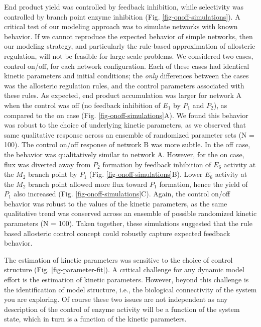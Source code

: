 \documentclass[12pt]{article}
\begin{document}
End product yield was controlled by feedback inhibition, while selectivity was controlled by branch point enzyme inhibition (Fig. \ref{fig-onoff-simulations}).
A critical test of our modeling approach was to simulate networks with known behavior. If we cannot reproduce the expected behavior of simple networks, then our
modeling strategy, and particularly the rule-based approximation of allosteric regulation, will not be feasible for large scale problems.
We considered two cases,  control on/off, for each network configuration. 
Each of these cases had identical kinetic parameters and initial conditions; 
the \textit{only} differences between the cases was the allosteric regulation rules, and the control parameters associated with these rules. 
As expected, end product accumulation was larger for network A when the control was off (no feedback inhibition of $E_{1}$ by $P_{1}$ and $P_{2}$),
as compared to the on case (Fig. \ref{fig-onoff-simulations}A). We found this behavior was robust to the choice of underlying kinetic parameters, 
as we observed that same qualitative response across an ensemble of randomized parameter sets (N = 100). 
The control on/off response of network B was more subtle. In the off case, the behavior was qualitatively similar to network A. 
However, for the on case, flux was diverted away from $P_{2}$ formation by feedback inhibition of $E_{6}$ activity at the $M_{2}$ branch point by $P_{1}$ (Fig. \ref{fig-onoff-simulations}B).
Lower $E_{6}$ activity at the $M_{2}$ branch point allowed more flux toward $P_{1}$ formation, hence the yield of $P_{1}$ also increased (Fig. \ref{fig-onoff-simulations}C).
Again, the control on/off behavior was robust to the values of the kinetic parameters, as the same qualitative trend was conserved across 
an ensemble of possible randomized kinetic parameters (N = 100). Taken together, these simulations suggested that the rule based allosteric control 
concept could robustly capture expected feedback behavior.

The estimation of kinetic parameters was sensitive to the choice of control structure (Fig. \ref{fig-parameter-fit}).
A critical challenge for any dynamic model effort is the estimation of kinetic parameters. 
However, beyond this challenge is the identification of model structure, i.e., the biological connectivity of the system you are exploring.
Of course these two issues are not independent as any description of the control of enzyme activity will be a function of the system state, which
in turn is a function of the kinetic parameters.
\end{document}

